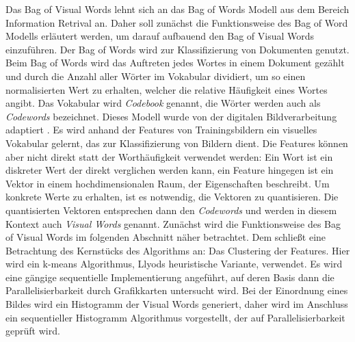 Das Bag of Visual Words lehnt sich an das Bag of Words Modell aus dem Bereich Information Retrival an. Daher soll zunächst die Funktionsweise des Bag of Word Modells erläutert werden, um darauf aufbauend den Bag of Visual Words einzuführen.\newline 
Der Bag of Words wird zur Klassifizierung von Dokumenten genutzt. Beim Bag of Words wird das Auftreten jedes Wortes in einem Dokument gezählt und durch die Anzahl aller Wörter im Vokabular dividiert, um so einen normalisierten Wert zu erhalten, welcher die relative Häufigkeit eines Wortes angibt. Das Vokabular wird \textit{Codebook} genannt, die Wörter werden auch als \textit{Codewords} bezeichnet.\newline
Dieses Modell wurde von der digitalen Bildverarbeitung adaptiert \cite{bok2004}. Es wird anhand der Features von Trainingsbildern ein visuelles Vokabular gelernt, das zur Klassifizierung von Bildern dient. Die Features können aber nicht direkt statt der Worthäufigkeit verwendet werden: Ein Wort ist ein diskreter Wert der direkt verglichen werden kann, ein Feature hingegen ist ein Vektor in einem hochdimensionalen Raum, der Eigenschaften beschreibt. Um konkrete Werte zu erhalten, ist es notwendig, die Vektoren zu quantisieren. Die quantisierten Vektoren entsprechen dann den \textit{Codewords} und werden in diesem Kontext auch \textit{Visual Words} genannt. 
Zunächst wird die Funktionsweise des Bag of Visual Words im folgenden Abschnitt näher betrachtet. Dem schließt eine Betrachtung des Kernstücks des Algorithms an: Das Clustering der Features. Hier wird ein k-means Algorithmus, Llyods heuristische Variante, verwendet. Es wird eine gängige sequentielle Implementierung angeführt, auf deren Basis dann die Parallelisierbarkeit durch Grafikkarten untersucht wird. 
Bei der Einordnung eines Bildes wird ein Histogramm der Visual Words generiert, daher wird im Anschluss ein sequentieller Histogramm Algorithmus vorgestellt, der auf Parallelisierbarkeit geprüft wird.

